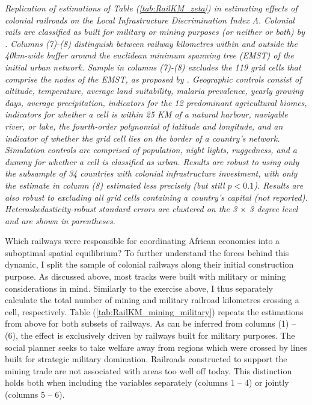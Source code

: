 \documentclass[11pt, oneside]{article}   	%
\let\oldref\ref
\renewcommand{\ref}[1]{(\oldref{#1})}
\newcommand{\mysubcaption}[1]{
\justify
\begin{spacing}{0.7}
\textit{\footnotesize #1}
\end{spacing}}
\begin{document}
\begin{table}[t]
{}

\mysubcaption{Replication of estimations of Table \ref{tab:RailKM_zeta} in estimating effects of colonial railroads on the Local Infrastructure Discrimination Index $\Lambda$. Colonial rails are classified as built for military or mining purposes (or neither or both) by \cite{Jedwab_PermanentEffectsTransportation_2016a}. Columns (7)-(8) distinguish between railway kilometres within and outside the 40km-wide buffer around the euclidean minimum spanning tree (EMST) of the initial urban network. Sample in columns (7)-(8) excludes the 119 grid cells that comprise the nodes of the EMST, as proposed by \citeauthor{Jedwab_PermanentEffectsTransportation_2016a}. Geographic controls consist of altitude, temperature, average land suitability, malaria prevalence, yearly growing days, average precipitation, indicators for the 12 predominant agricultural biomes, indicators for whether a cell is within 25 KM of a natural harbour, navigable river, or lake, the fourth-order polynomial of latitude and longitude, and an indicator of whether the grid cell lies on the border of a country's network. Simulation controls are comprised of population, night lights, ruggedness, and a dummy for whether a cell is classified as urban. Results are robust to using only the subsample of 34 countries with colonial infrastructure investment, with only the estimate in column (8) estimated less precisely (but still $p<0.1$). Results are also robust to excluding all grid cells containing a country's capital (not reported). Heteroskedasticity-robust standard errors are clustered on the 3 $\times$ 3 degree level and are shown in parentheses.}
\end{table}

Which railways were responsible for coordinating African economies into a suboptimal spatial equilibrium? To further understand the forces behind this dynamic, I split the sample of colonial railways along their initial construction purpose. As discussed above, most tracks were built with military or mining considerations in mind. Similarly to the exercise above, I thus separately calculate the total number of mining and military railroad kilometres crossing a cell, respectively. Table \ref{tab:RailKM_mining_military} repeats the estimations from above for both subsets of railways. As can be inferred from columns (1) -- (6), the effect is exclusively driven by railways built for military purposes. The social planner seeks to take welfare away from regions which were crossed by lines built for strategic military domination. Railroads constructed to support the mining trade are not associated with areas too well off today. This distinction holds both when including the variables separately (columns 1 -- 4) or jointly (columns 5 -- 6).
\end{document}
